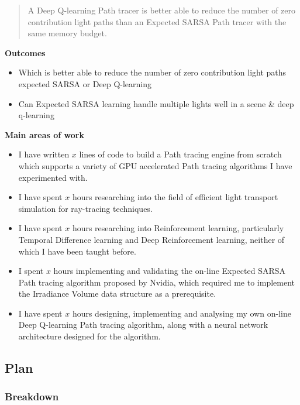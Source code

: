 \documentclass[ %
                    author={Callum Pearce},
                supervisor={Dr. Neill Campbell},
                    degree={MEng},
                     title={How effective are Temporal difference learning methods in reducing the number of zero contribution light paths in Path tracing?},
                  subtitle={},
                      type={research},
                      year={2019} ]{dissertation}
\begin{document}
\begin{quote}
A Deep Q-learning Path tracer is better able to reduce
the number of zero contribution light paths than an Expected SARSA
Path tracer with the same memory budget.
\end{quote}


\noindent
\textbf{Outcomes}
\begin{itemize}
\item Which is better able to reduce the number of zero contribution light paths expected SARSA or Deep Q-learning
\item Can Expected SARSA learning handle multiple lights well in a scene \& deep q-learning
\end{itemize}

\noindent
\textbf{Main areas of work}
\begin{itemize}
\item I have written $x$ lines of code to build a  Path tracing engine from scratch which supports a variety of GPU accelerated Path tracing algorithms I have experimented with.

\item I have spent $x$ hours researching into the field of efficient light transport simulation for ray-tracing techniques.

\item I have spent $x$ hours researching into Reinforcement learning, particularly Temporal Difference learning and Deep Reinforcement learning, neither of which I have been taught before.

\item I spent $x$ hours implementing and validating the on-line Expected SARSA Path tracing algorithm proposed by Nvidia, which required me to implement the Irradiance Volume data structure as a prerequisite.

\item I have spent $x$ hours designing, implementing and analysing my own on-line Deep Q-learning Path tracing algorithm, along with a neural network architecture
designed for the algorithm.

\end{itemize}

\subsection{Plan}
\subsubsection{Breakdown}
\end{document}
